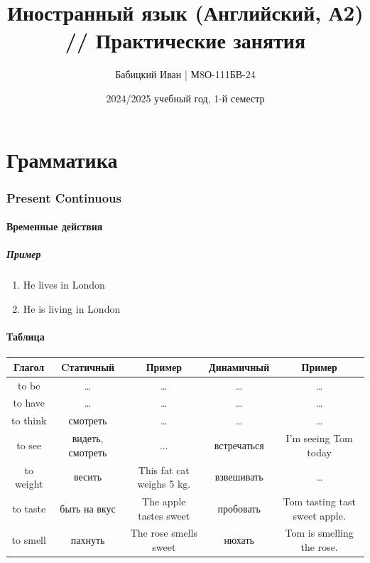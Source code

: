 \documentclass{article}
\begin{document}
\begin{titlepage}
    \title{Иностранный язык (Английский, А2) // Практические занятия}
    \author{Бабицкий Иван | М8О-111БВ-24}
    \date{2024/2025 учебный год, 1-й семестр}
    \maketitle
\end{titlepage}

\tableofcontents



\part{Грамматика}

\section{Present Continuous}

\subsection{Временные действия}

\subsubsection{Пример}
\begin{enumerate}
    \item He lives in London
    \item He is living in London
\end{enumerate}

\subsection{Таблица}
\begin{tabular}{c|c|c|c|c}
    Глагол & Cтатичный & Пример & Динамичный & Пример \\
    \hline
    to be & \dots & \dots & \dots & \dots \\
    to have & \dots & \dots & \dots & \dots \\
    to think & смотреть & \dots & \dots & \dots \\
    to see & видеть, смотреть & ... & встречаться & I'm seeing Tom today \\
    to weight & весить & This fat cat weighs 5 kg. & взвешивать & \dots \\
    to taste & быть на вкус & The apple tastes sweet & пробовать & Tom tasting tast sweet apple. \\
    to smell & пахнуть & The rose smells sweet & нюхать & Tom is smelling the rose.
\end{tabular}
\end{document}
